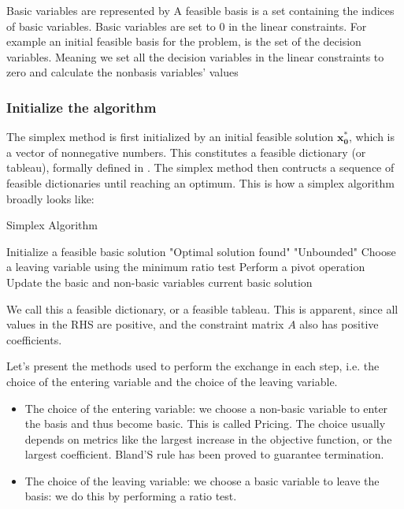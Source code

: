 Basic variables are represented by A feasible basis is a set containing the indices of basic
variables. Basic variables are set to 0 in the linear constraints.
For example an initial feasible basis for the problem, is the set of the decision variables.
Meaning we set all the decision variables in the linear constraints to zero and
calculate the nonbasis variables' values

\subsubsection{Initialize the algorithm}

The simplex method is first initialized by
an initial feasible solution $\mathbf{x^*_0}$, which is a vector of nonnegative numbers.
This constitutes a feasible dictionary (or tableau), formally defined in \parencite{chvatal1983linear}.
The simplex method then contructs a sequence of feasible dictionaries until reaching an optimum.
This is how a simplex algorithm broadly looks like:

\begin{algorithm}
    \caption{Simplex Algorithm}
    \begin{algorithmic}[1]
        \State Initialize a feasible basic solution
        \State \Return "Optimal solution found"
        \EndIf
        \State \Return "Unbounded"
        \EndIf
        \State Choose a leaving variable using the minimum ratio test
        \State Perform a pivot operation
        \State Update the basic and non-basic variables
        \State \Return current basic solution
        \EndProcedure
    \end{algorithmic}
\end{algorithm}


We call this a feasible dictionary\parencite{chvatal1983linear}, or a feasible tableau. This is apparent, since all
values in the RHS are positive, and the constraint matrix $A$ also has positive coefficients.

Let's present the methods used to perform the exchange in each step, i.e. the choice of the entering
variable and the choice of the leaving variable.

\begin{itemize}
    \item The choice of the entering variable: we choose a non-basic variable to enter the basis
          and thus become basic. This is called Pricing. The choice usually depends on metrics
          like the largest increase in the objective function, or the largest coefficient. Bland'S
          rule has been proved to guarantee termination.

    \item The choice of the leaving variable: we choose a basic variable to leave the basis:
          we do this by performing a ratio test.
\end{itemize}
